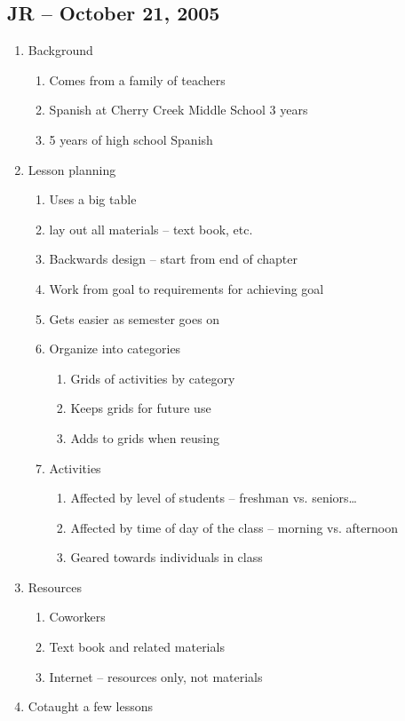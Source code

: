 \subsection{JR -- October 21, 2005}
\begin{enumerate}
	\item Background
	\begin{enumerate}
		\item Comes from a family of teachers
		\item Spanish at Cherry Creek Middle School 3 years
		\item 5 years of high school Spanish
	\end{enumerate}
	\item Lesson planning
	\begin{enumerate}
		\item Uses a big table
		\item lay out all materials -- text book, etc.
		\item Backwards design -- start from end of chapter
		\item Work from goal to requirements for achieving goal
		\item Gets easier as semester goes on
		\item Organize into categories
		\begin{enumerate}
			\item Grids of activities by category
			\item Keeps grids for future use
			\item Adds to grids when reusing
		\end{enumerate}
		\item Activities
		\begin{enumerate}
			\item Affected by level of students -- freshman vs. seniors\ldots
			\item Affected by time of day of the class -- morning vs. afternoon
			\item Geared towards individuals in class
		\end{enumerate}
	\end{enumerate}
	\item Resources
	\begin{enumerate}
		\item Coworkers
		\item Text book and related materials
		\item Internet -- resources only, not materials
	\end{enumerate}
	\item Cotaught a few lessons

\end{enumerate}
